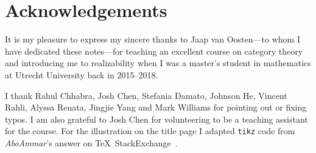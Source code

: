 \chapter{Acknowledgements}

It is my pleasure to express my sincere thanks to Jaap van Oosten---to whom I
have dedicated these notes---for teaching an excellent course on category
theory~\cite{vanOosten2016} and introducing me to realizability when I was a
master's student in mathematics at Utrecht University back in 2015--2018.

I thank Rahul Chhabra, Josh Chen, Stefania Damato, Johnson He, Vincent Rahli,
Alyssa Renata, Jingjie Yang and Mark Williams for pointing out or fixing typos.
%
I am also grateful to Josh Chen for volunteering to be a teaching assistant for
the course.
%
For the illustration on the title page I adapted \verb|tikz| code from
\emph{AboAmmar}'s answer on \TeX\ StackExchange~\cite{latex-triangle}.

